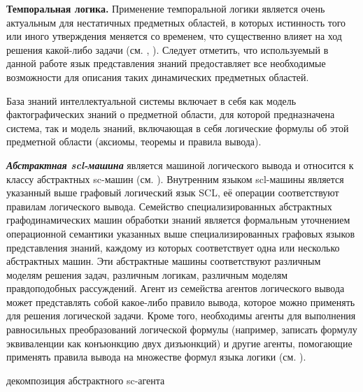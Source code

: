 \begin{textitemize}
	\item{\textbf{Темпоральная логика.} Применение темпоральной логики является очень актуальным для нестатичных предметных областей, в которых истинность того или иного утверждения меняется со временем, что существенно влияет на ход решения какой-либо задачи (см. \textit{}, \textit{}). Следует отметить, что используемый в данной работе язык представления знаний предоставляет все необходимые возможности для описания таких динамических предметных областей.}
\end{textitemize}

База знаний интеллектуальной системы включает в себя как модель фактографических знаний о предметной области, для которой предназначена система, так и модель знаний, включающая в себя логические формулы об этой предметной области (аксиомы, теоремы и правила вывода).

\textit{\textbf{Абстрактная scl-машина}} является машиной логического вывода и относится к классу абстрактных sc-машин (см. \textit{}). Внутренним языком scl-машины является указанный выше графовый логический язык SCL, её операции соответствуют правилам логического вывода. Семейство специализированных абстрактных графодинамических машин обработки знаний является формальным уточнением операционной семантики указанных выше специализированных графовых языков представления знаний, каждому из которых соответствует одна или несколько абстрактных машин. Эти абстрактные машины соответствуют различным моделям решения задач, различным логикам, различным моделям правдоподобных рассуждений. 
Агент из семейства агентов логического вывода может представлять собой какое-либо правило вывода, которое можно применять для решения логической задачи. Кроме того, необходимы агенты для выполнения равносильных преобразований логической формулы (например, записать формулу эквиваленции как конъюнкцию двух дизъюнкций) и другие агенты, помогающие применять правила вывода на множестве формул языка логики (см. \textit{}).

\begin{SCn}
	\begin{scnrelfromset}{декомпозиция абстрактного sc-агента}
	\end{scnrelfromset}
\begin{scnindent}
\end{scnindent}
\end{SCn}

